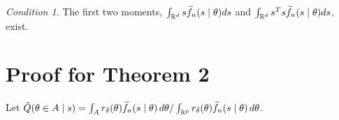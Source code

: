 \documentclass[9pt]{article}
\theoremstyle{remark}
\newtheorem{condition}{Condition}
\begin{document}
\begin{condition} \label{cond:likelihood_moments}
	The first two moments, $\int_{\mathbb{R}^{d}}s\widetilde{f}_{n}(s\mid\theta)ds$
	and $\int_{\mathbb{R}^d}s^{T}s\widetilde{f}_{n}(s\mid\theta)ds$, exist. 
\end{condition}


\section{Proof for Theorem 2}

\noindent Let $\tilde{Q}(\theta\in A\mid s)=\int_{A}r_{\delta}(\theta)\widetilde{f}_{n}(s\mid\theta)\,d\theta/\int_{\mathbb{R}^{p}}r_{\delta}(\theta)\widetilde{f}_{n}(s\mid\theta)\,d\theta$. 
\end{document}
